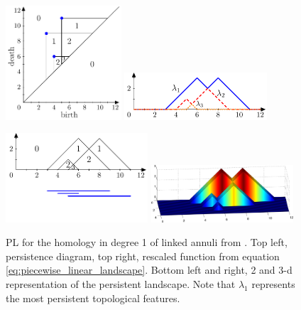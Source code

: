 \documentclass{article}
\begin{document}
\begin{figure}[htb]
  \centering
  \begin{minipage}{60mm}
    \includegraphics[width=43mm]{figures/persistence_landscape_bubenik_paper/landscapes-figure7.pdf} %
    \includegraphics[width=53mm]{figures/persistence_landscape_bubenik_paper/landscapes-figure9.pdf}
  \end{minipage}
  \begin{minipage}{60mm}
    \vspace{5ex}
    \includegraphics[width=53mm]{figures/persistence_landscape_bubenik_paper/landscapes-figure8.pdf} %
    \includegraphics[width=53mm]{figures/persistence_landscape_bubenik_paper/paper3dlandscape.png}
  \end{minipage}
  \vspace{5ex}
  \caption{PL for the homology in degree 1 of linked annuli from \citet{bubenik2015statistical}. Top
    left, persistence diagram, top right, rescaled function from equation
    \ref{eq:piecewise_linear_landscape}. Bottom left and right, 2 and 3-d representation of the
    persistent landscape. Note that $\lambda_1$ represents the most persistent topological features.}
  \label{fig:pl_bubenik}
\end{figure}
\end{document}
